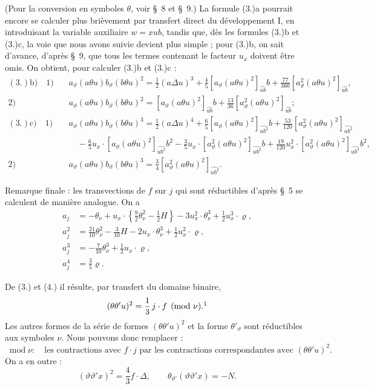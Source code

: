 \documentclass[11pt]{article}
\newcommand{\A}{\Delta}
\newcommand{\modu}[1]{\;\operatorname{mod} #1}
\providecommand{\modu}[1]{\;\operatorname{mod} #1}
\begin{document}
(Pour la conversion en symboles $\theta$, voir \S\ 8 et \S\ 9.) La formule (3.)a pourrait encore se calculer plus brièvement par transfert direct du développement I, en introduisant la variable auxiliaire $w=x\widehat{u}b$, tandis que, dès les formules (3.)b et (3.)c, la voie que nous avons suivie devient plus simple ; pour (3.)b, on sait d'avance, d'après \S\ 9, que tous les termes contenant le facteur $u_x$ doivent être omis. On obtient, pour calculer (3.)b et (3.)c :
\[
\begin{aligned}
(3.)\mathrm{b)}\quad 1)&\quad a_\vartheta(a\theta u)b_\vartheta(b\theta u)^2=\frac12(a\Delta u)^3+\frac45[a_\vartheta(a\theta u)^2]_{\widehat{ub}}b+\frac{77}{360}[a_\vartheta^2(a\theta u)^2]_{\widehat{ub}},\\
2)&\quad a_\vartheta(a\theta u)b_\vartheta(b\theta u)^2=[a_\vartheta(a\theta u)^2]_{\widehat{ub}}b+\frac{13}{36}[a_\vartheta^2(a\theta u)^2]_{\widehat{ub}};\\[.5em]
(3.)\mathrm{c)}\quad 1)&\quad a_\vartheta(a\theta u)b_\vartheta(b\theta u)^3=\frac12(a\Delta u)^4+\frac65[a_\vartheta(a\theta u)^2]_{\widehat{ub^2}}b+\frac{53}{120}[a_\vartheta^2(a\theta u)^2]_{\widehat{ub^2}}\\
&\qquad-\frac65u_x\cdot[a_\vartheta(a\theta u)^2]_{\widehat{ub^2}}b^2-\frac35u_x\cdot[a_\vartheta^2(a\theta u)^2]_{\widehat{ub^2}}b+\frac{19}{120}u_x^2\cdot[a_\vartheta^2(a\theta u)^2]_{\widehat{ub^3}}b^2,\\
2)&\quad a_\vartheta(a\theta u)b_\vartheta(b\theta u)^3=\frac34[a_\vartheta^2(a\theta u)^2]_{\widehat{ub^2}}.
\end{aligned}
\]

Remarque finale : les transvections de $f$ sur $j$ qui sont réductibles d'après \S\ 5 se calculent de manière analogue. On a
\[
\tag{4}
\begin{aligned}
a_j&=-\theta_\nu+u_x\cdot\left\{\frac92\theta_\nu^2-\frac12H\right\}-3u_x^2\cdot\theta_\nu^3+\frac12u_x^3\cdot\varrho,\\
a_j^2&=\frac{21}{10}\theta_\nu^2-\frac3{10}H-2u_x\cdot\theta_\nu^3+\frac12u_x^2\cdot\varrho,\\
a_j^3&=-\frac7{10}\theta_\nu^3+\frac12u_x\cdot\varrho,\\
a_j^4&=\frac35\varrho.
\end{aligned}
\]

De (3.) et (4.) il résulte, par transfert du domaine binaire,
\[
(\theta\theta'u)^2=\frac13\,j\cdot f\pmod{\nu}.\footnotemark
\]
Les autres formes de la série de formes $(\theta\theta'u)^2$ et la forme $\theta'_\vartheta$ sont réductibles aux symboles $\nu$. Nous pouvons donc remplacer :
\[
\modu{\nu}:\quad \text{les contractions avec } f\cdot j
\text{ par les contractions correspondantes avec }(\theta\theta'u)^2.
\]
On a en outre :
\[
(\vartheta\vartheta'x)^2=\frac43 f\cdot\A,
\qquad
\theta_{\vartheta'}(\vartheta\vartheta'x)=-N.
\]
\end{document}
